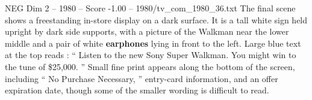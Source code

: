 \begin{textsample}{NEG Dim 2 – 1980 – Score -1.00 – 1980/tv\_com\_1980\_36.txt}
The final scene shows a freestanding in-store display on a dark surface.
It is a tall white sign held upright by dark side supports, with a picture of the Walkman near the lower middle and a pair of white \textbf{earphones} lying in front to the left.
Large blue text at the top reads : “ Listen to the new Sony Super Walkman.
You might win to the tune of \$25,000. ” Small fine print appears along the bottom of the screen, including “ No Purchase Necessary, ” entry-card information, and an offer expiration date, though some of the smaller wording is difficult to read.

\end{textsample}
